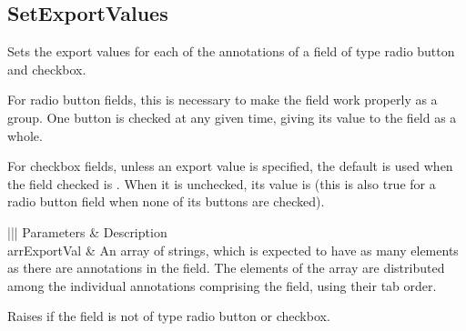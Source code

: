 \documentclass[letterpaper,12pt,english,openany,oneside]{sphinxmanual}
\begin{document}
\subsection{SetExportValues}
\label{\detokenize{IAC_API_FormsIntro:setexportvalues}}
Sets the export values for each of the annotations of a field of type radio button and checkbox.

For radio button fields, this is necessary to make the field work properly as a group. One button is checked at any given time, giving its value to the field as a whole.

For checkbox fields, unless an export value is specified, the default is used when the field checked is . When it is unchecked, its value is  (this is also true for a radio button field when none of its buttons are checked).

\label{\detokenize{IAC_API_FormsIntro:syntax-5}}

\begin{sphinxVerbatim}[commandchars=\\\{\}]
    
\end{sphinxVerbatim}
\label{\detokenize{IAC_API_FormsIntro:parameters-5}}


\begin{savenotes}\sphinxattablestart
\centering
{}\label{\detokenize{IAC_API_FormsIntro:section-6}}\nobreak
\begin{tabular}[t]{|||}
\hline
\sphinxstyletheadfamily 
Parameters
&\sphinxstyletheadfamily 
Description
\\
\hline
arrExportVal
&
An array of strings, which is expected to have as many elements as there are annotations in the field. The elements of the array are distributed among the individual annotations comprising the field, using their tab order.
\\
\hline
\end{tabular}
\par
\sphinxattableend\end{savenotes}
\label{\detokenize{IAC_API_FormsIntro:exceptions-4}}

Raises  if the field is not of type radio button or checkbox.
\end{document}
